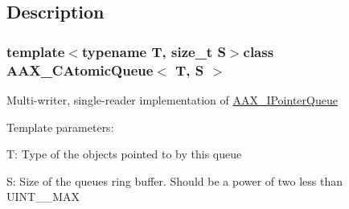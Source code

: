 \subsection{Description}
\subsubsection*{template$<$typename T, size\+\_\+t S$>$class A\+A\+X\+\_\+\+C\+Atomic\+Queue$<$ T, S $>$}

Multi-\/writer, single-\/reader implementation of \hyperlink{a00110}{A\+A\+X\+\_\+\+I\+Pointer\+Queue}

Template parameters\+:
\begin{DoxyItemize}
\item {\ttfamily T\+:} Type of the objects pointed to by this queue
\item {\ttfamily S\+:} Size of the queue\textquotesingle{}s ring buffer. Should be a power of two less than {\ttfamily U\+I\+N\+T\+\_\+\_\+\+M\+A\+X} 
\end{DoxyItemize}

